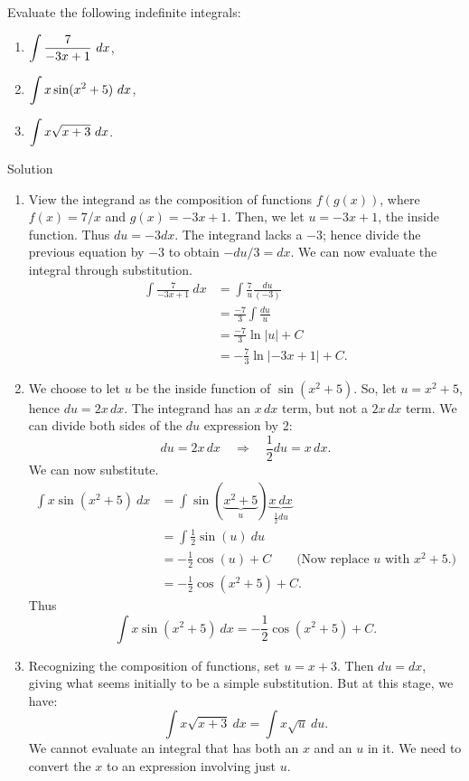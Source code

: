 \begin{example}
Evaluate the following indefinite integrals:
\begin{multicols}{3}
\begin{enumerate}
\item $\ds \int \frac{7}{-3x+1}\ dx$,
\item $\ds \int x\sin(x^2+5)\ dx$,
\item $\ds\int x\sqrt{x+3}\ dx$.
\end{enumerate}
\end{multicols}

Solution 

\begin{enumerate}
\item View the integrand as the composition of functions $f(g(x))$, where $f(x) = 7/x$ and $g(x) = -3x+1$. Then, we let $u = -3x+1$, the inside function. Thus $du = -3dx$. The integrand lacks a $-3$; hence divide the previous equation by $-3$ to obtain $-du/3 = dx$. We can now evaluate the integral through substitution.
\begin{align*}
	\int \frac{7}{-3x+1}\ dx &=	\int \frac{7}{u}\frac{du}{(-3)} \\[0.2cm]
												&= \frac{-7}3\int \frac{du}{u} \\[0.2cm]
												&=	\frac{-7}3\ln |u| + C\\[0.2cm]
												&=-\frac73\ln|-3x+1| + C.
\end{align*}
\item  We choose to let $u$ be the inside function of $\sin(x^2+5)$. So, let $u = x^2+5$, hence $du = 2x\,dx$. The integrand has an $x\,dx$ term, but not a $2x\,dx$ term.  We can divide both sides of the $du$ expression by 2:
	$$du = 2x\,dx \quad \Rightarrow \quad \frac12du = x\,dx.$$ We can now substitute.
	\allowdisplaybreaks
	\begin{align*}\int x\sin(x^2+5)\ dx &= \int \sin(\underbrace{x^2+5}_u) \underbrace{x\ dx}_{\frac12du}\\[0.2cm]
						 &= \int \frac12\sin(u)\ du\\
			\phantom{\int x\sin(x^2+5)\ dx} &= -\frac12\cos(u) + C \quad\quad \text{(Now replace $u$ with $x^2+5$.)}\\
						 &=-\frac12\cos(x^2+5) + C.
	\end{align*}
Thus 
$$\int x\sin(x^2+5)\ dx = -\frac12\cos(x^2+5)+C.$$
\item Recognizing the composition of functions, set $u = x+3$. Then $du = dx$, giving what seems initially to be a simple substitution. But at this stage, we have:
	$$\int x\sqrt{x+3}\ dx = \int x\sqrt{u}\ du.$$
We cannot evaluate an integral that has both an $x$ and an $u$ in it. We need to convert the $x$ to an expression involving just $u$.


\end{enumerate}
\end{example}
